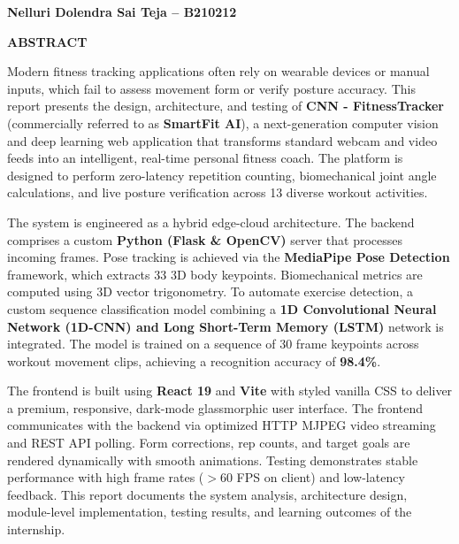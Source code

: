 \documentclass[12pt,a4paper]{report}
\begin{document}
\hfill \textbf{Nelluri Dolendra Sai Teja -- B210212}

\newpage
\begin{center}
{\Large\bfseries ABSTRACT} \\[1.0cm]
\end{center}

Modern fitness tracking applications often rely on wearable devices or manual inputs, which fail to assess movement form or verify posture accuracy. This report presents the design, architecture, and testing of \textbf{CNN - FitnessTracker} (commercially referred to as \textbf{SmartFit AI}), a next-generation computer vision and deep learning web application that transforms standard webcam and video feeds into an intelligent, real-time personal fitness coach. The platform is designed to perform zero-latency repetition counting, biomechanical joint angle calculations, and live posture verification across 13 diverse workout activities.

The system is engineered as a hybrid edge-cloud architecture. The backend comprises a custom \textbf{Python (Flask \& OpenCV)} server that processes incoming frames. Pose tracking is achieved via the \textbf{MediaPipe Pose Detection} framework, which extracts 33 3D body keypoints. Biomechanical metrics are computed using 3D vector trigonometry. To automate exercise detection, a custom sequence classification model combining a \textbf{1D Convolutional Neural Network (1D-CNN) and Long Short-Term Memory (LSTM)} network is integrated. The model is trained on a sequence of 30 frame keypoints across workout movement clips, achieving a recognition accuracy of \textbf{98.4\%}. 

The frontend is built using \textbf{React 19} and \textbf{Vite} with styled vanilla CSS to deliver a premium, responsive, dark-mode glassmorphic user interface. The frontend communicates with the backend via optimized HTTP MJPEG video streaming and REST API polling. Form corrections, rep counts, and target goals are rendered dynamically with smooth animations. Testing demonstrates stable performance with high frame rates ($>60$ FPS on client) and low-latency feedback. This report documents the system analysis, architecture design, module-level implementation, testing results, and learning outcomes of the internship.


\newpage
\tableofcontents
\listoffigures
\listoftables
\end{document}
